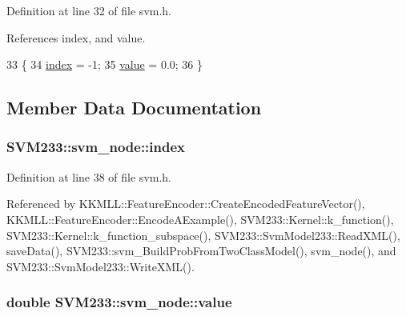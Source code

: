Definition at line 32 of file svm.\+h.



References index, and value.


\begin{DoxyCode}
33     \{
34       \hyperlink{struct_s_v_m233_1_1svm__node_a3c4e097d4f2ba8091128a9b605fcaa12}{index} = -1;
35       \hyperlink{struct_s_v_m233_1_1svm__node_abc3f1df2ce88e0759c7f3fe74eefcf0d}{value} = 0.0;
36     \}
\end{DoxyCode}


\subsection{Member Data Documentation}
\subsubsection[{\texorpdfstring{index}{index}}]{ S\+V\+M233\+::svm\+\_\+node\+::index}\hypertarget{struct_s_v_m233_1_1svm__node_a3c4e097d4f2ba8091128a9b605fcaa12}{}\label{struct_s_v_m233_1_1svm__node_a3c4e097d4f2ba8091128a9b605fcaa12}


Definition at line 38 of file svm.\+h.



Referenced by K\+K\+M\+L\+L\+::\+Feature\+Encoder\+::\+Create\+Encoded\+Feature\+Vector(), K\+K\+M\+L\+L\+::\+Feature\+Encoder\+::\+Encode\+A\+Example(), S\+V\+M233\+::\+Kernel\+::k\+\_\+function(), S\+V\+M233\+::\+Kernel\+::k\+\_\+function\+\_\+subspace(), S\+V\+M233\+::\+Svm\+Model233\+::\+Read\+X\+M\+L(), save\+Data(), S\+V\+M233\+::svm\+\_\+\+Build\+Prob\+From\+Two\+Class\+Model(), svm\+\_\+node(), and S\+V\+M233\+::\+Svm\+Model233\+::\+Write\+X\+M\+L().

\subsubsection[{\texorpdfstring{value}{value}}]{\setlength{\rightskip}{0pt plus 5cm}double S\+V\+M233\+::svm\+\_\+node\+::value}\hypertarget{struct_s_v_m233_1_1svm__node_abc3f1df2ce88e0759c7f3fe74eefcf0d}{}\label{struct_s_v_m233_1_1svm__node_abc3f1df2ce88e0759c7f3fe74eefcf0d}


